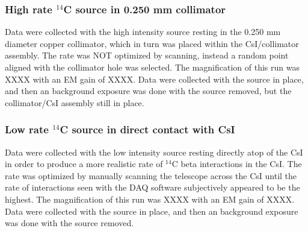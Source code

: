 \documentclass[11pt]{article}
\newcommand{\nuc}[2]{\ensuremath{^{#1}}#2}
\begin{document}
\subsubsection{High rate \nuc{14}{C} source in 0.250 mm collimator} 
Data were collected with the high intensity source resting in the 0.250 mm diameter copper collimator, which in turn was placed within the CsI/collimator assembly. The rate was NOT optimized by scanning,
instead a random point aligned with the collimator hole was selected. The magnification of this run was XXXX with an EM gain of XXXX. 
Data were collected with the source in place, and then an background exposure was done with the source removed, but the collimator/CsI assembly still in place. 

 
 
 
 \subsubsection{Low rate \nuc{14}{C} source in direct contact with CsI} 
Data were collected with the low intensity source resting directly atop of the CsI in order to produce a more realistic rate of \nuc{14}{C} beta interactions in the CsI. The rate was optimized by manually scanning the telescope  across the CsI until the rate of interactions seen with the DAQ software subjectively appeared to be the highest. The magnification of this run was XXXX with an EM gain of XXXX. 
Data were collected with the source in place, and then an background exposure was done with the source removed. 

 
\end{document}
